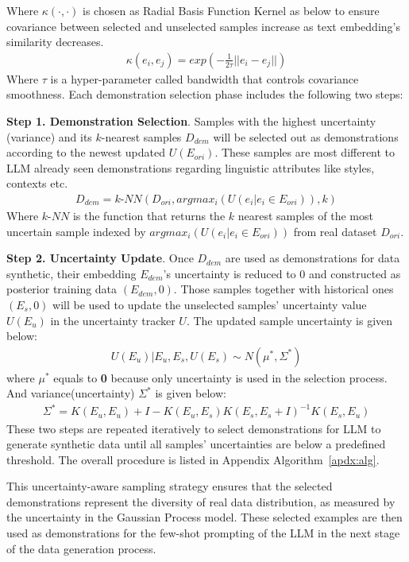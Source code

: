 Where $\kappa(\cdot, \cdot)$ is chosen as Radial Basis Function Kernel as below to ensure covariance between selected and unselected samples increase as text embedding's similarity decreases.
\begin{align}
\kappa(e_i, e_j) = exp(-\frac{1}{2\tau}||e_i- e_j||)
\end{align} 
Where $\tau$ is a hyper-parameter called bandwidth that controls covariance smoothness. Each demonstration selection phase includes the following two steps:

\textbf{Step 1. Demonstration Selection}. Samples with the highest uncertainty (variance) and its $k$-nearest samples $D_{dem}$ will be selected out as demonstrations according to the newest updated $U(E_{ori})$. These samples are most different to LLM already seen demonstrations regarding linguistic attributes like styles, contexts etc.
\begin{align}
D_{dem} = k\text{-}NN(D_{ori}, argmax_{i}(U(e_i|e_i \in E_{ori})), k)
\end{align} 
Where $k\text{-}NN$ is the function that returns the $k$ nearest samples of the most uncertain sample indexed by $argmax_{i}(U(e_i|e_i \in E_{ori}))$ from real dataset $D_{ori}$.

\textbf{Step 2. Uncertainty Update}. Once $D_{dem}$ are used as demonstrations for data synthetic, their embedding $E_{dem}$'s uncertainty is reduced to 0 and constructed as posterior training data $(E_{dem}, 0)$. Those samples together with historical ones $(E_{s}, 0)$ will be used to update the unselected samples' uncertainty value $U(E_{u})$ in the uncertainty tracker $U$. The updated sample uncertainty is given below:
\begin{align}
U(E_{u}) | E_{u}, E_{s}, U(E_{s}) \sim N\left(\mu^*,\Sigma^*\right) 
\end{align}                          
where $\mu^*$ equals to \textbf{0} because only uncertainty is used in the selection process. And variance(uncertainty) $\Sigma^*$ is given below:
\begin{align}
\Sigma^* = K(E_{u}, E_{u}) + I -K(E_{u}, E_{s})K(E_{s}, E_{s} + I)^{-1}K(E_{s}, E_{u}) 
\end{align} 
These two steps are repeated iteratively to select demonstrations for LLM to generate synthetic data until all samples' uncertainties are below a predefined threshold. The overall procedure is listed in Appendix Algorithm~\ref{apdx:alg}.

This uncertainty-aware sampling strategy ensures that the selected demonstrations represent the diversity of real data distribution, as measured by the uncertainty in the Gaussian Process model. These selected examples are then used as demonstrations for the few-shot prompting of the LLM in the next stage of the data generation process.

